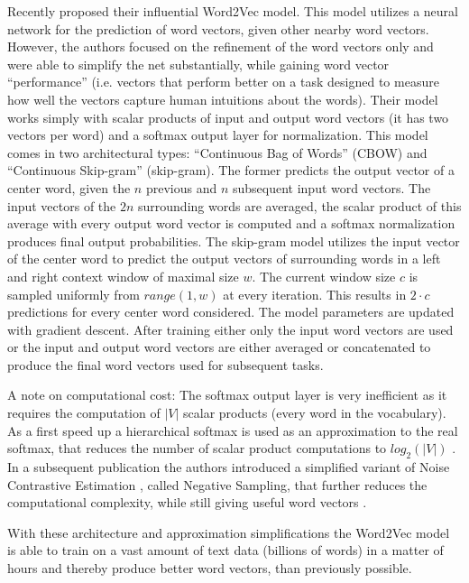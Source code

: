 \documentclass[Thesis.tex]{subfiles}
\begin{document}
Recently \citet{Mikolov2013a} proposed their influential Word2Vec model.
This model utilizes a neural network for the prediction of word vectors,
given other nearby word vectors. However, the authors focused on the
refinement of the word vectors only and were able to simplify the
net substantially, while gaining word vector ``performance'' (i.e.
vectors that perform better on a task designed to measure how well
the vectors capture human intuitions about the words). Their model
works simply with scalar products of input and output word vectors
(it has two vectors per word) and a softmax output layer for normalization.
This model comes in two architectural types: ``Continuous Bag of Words''
(CBOW) and ``Continuous Skip-gram'' (skip-gram). The former predicts
the output vector of a center word, given the $n$ previous and
$n$ subsequent input word vectors. The input vectors of the $2n$
surrounding words are averaged, the scalar product of this average
with every output word vector is computed and a softmax normalization
produces final output probabilities. The skip-gram model utilizes
the input vector of the center word to predict the output vectors
of surrounding words in a left and right context window of maximal
size $w$. The current window size $c$ is sampled uniformly from
$range(1,w)$ at every iteration. This results in $2\cdot c$ predictions
for every center word considered. The model parameters are updated
with gradient descent. After training either only the input word vectors
are used or the input and output word vectors are either averaged
or concatenated to produce the final word vectors used for subsequent
tasks. 

A note on computational cost: The softmax output layer is very inefficient
as it requires the computation of $|V|$ scalar products (every word
in the vocabulary). As a first speed up a hierarchical softmax \citep{Morin2005} is
used as an approximation to the real softmax, that reduces the number
of scalar product computations to $log_{2}(|V|)$ \citep{Mikolov2013a}.
In a subsequent publication the authors introduced a
simplified variant of Noise Contrastive Estimation \citep{Gutmann2012}, called
Negative Sampling, that further reduces the computational complexity,
while still giving useful word vectors \citep{Mikolov2013b}. 

With these architecture and approximation simplifications the Word2Vec
model is able to train on a vast amount of text data (billions of
words) in a matter of hours and thereby produce better word vectors,
than previously possible.
\end{document}

